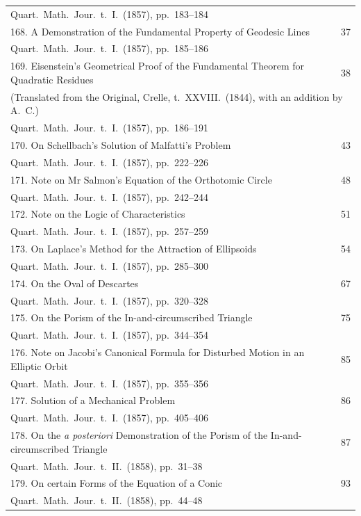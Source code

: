 \documentclass[12pt,a4paper]{article}
\theoremstyle{plain}
\begin{document}
\begin{longtable}{p{}r}
\multicolumn{2}{l}{\small Quart.\ Math.\ Jour.\ t.~I.\ (1857), pp.~183--184} \\[0.5em]
%
168. A Demonstration of the Fundamental Property of Geodesic Lines \dotfill & 37 \\
\multicolumn{2}{l}{\small Quart.\ Math.\ Jour.\ t.~I.\ (1857), pp.~185--186} \\[0.5em]
%
169. Eisenstein's Geometrical Proof of the Fundamental Theorem for Quadratic Residues \dotfill & 38 \\
\multicolumn{2}{l}{\small (Translated from the Original, Crelle, t.~XXVIII.\ (1844), with an addition by A.~C.)} \\
\multicolumn{2}{l}{\small Quart.\ Math.\ Jour.\ t.~I.\ (1857), pp.~186--191} \\[0.5em]
%
170. On Schellbach's Solution of Malfatti's Problem \dotfill & 43 \\
\multicolumn{2}{l}{\small Quart.\ Math.\ Jour.\ t.~I.\ (1857), pp.~222--226} \\[0.5em]
%
171. Note on Mr Salmon's Equation of the Orthotomic Circle \dotfill & 48 \\
\multicolumn{2}{l}{\small Quart.\ Math.\ Jour.\ t.~I.\ (1857), pp.~242--244} \\[0.5em]
%
172. Note on the Logic of Characteristics \dotfill & 51 \\
\multicolumn{2}{l}{\small Quart.\ Math.\ Jour.\ t.~I.\ (1857), pp.~257--259} \\[0.5em]
%
173. On Laplace's Method for the Attraction of Ellipsoids \dotfill & 54 \\
\multicolumn{2}{l}{\small Quart.\ Math.\ Jour.\ t.~I.\ (1857), pp.~285--300} \\[0.5em]
%
174. On the Oval of Descartes \dotfill & 67 \\
\multicolumn{2}{l}{\small Quart.\ Math.\ Jour.\ t.~I.\ (1857), pp.~320--328} \\[0.5em]
%
175. On the Porism of the In-and-circumscribed Triangle \dotfill & 75 \\
\multicolumn{2}{l}{\small Quart.\ Math.\ Jour.\ t.~I.\ (1857), pp.~344--354} \\[0.5em]
%
176. Note on Jacobi's Canonical Formula for Disturbed Motion in an Elliptic Orbit \dotfill & 85 \\
\multicolumn{2}{l}{\small Quart.\ Math.\ Jour.\ t.~I.\ (1857), pp.~355--356} \\[0.5em]
%
177. Solution of a Mechanical Problem \dotfill & 86 \\
\multicolumn{2}{l}{\small Quart.\ Math.\ Jour.\ t.~I.\ (1857), pp.~405--406} \\[0.5em]
%
178. On the \textit{a posteriori} Demonstration of the Porism of the In-and-circumscribed Triangle \dotfill & 87 \\
\multicolumn{2}{l}{\small Quart.\ Math.\ Jour.\ t.~II.\ (1858), pp.~31--38} \\[0.5em]
%
179. On certain Forms of the Equation of a Conic \dotfill & 93 \\
\multicolumn{2}{l}{\small Quart.\ Math.\ Jour.\ t.~II.\ (1858), pp.~44--48} \\[0.5em]
\bottomrule
\end{longtable}
\end{document}

